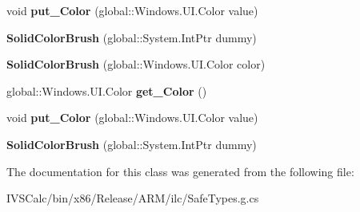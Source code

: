\begin{DoxyCompactItemize}
void {\bfseries put\+\_\+\+Color} (global\+::\+Windows.\+U\+I.\+Color value)
\item 
\mbox{\label{class_windows_1_1_u_i_1_1_xaml_1_1_media_1_1_solid_color_brush_a5ca00027c961ac6710af259a53e61a4f}} 
{\bfseries Solid\+Color\+Brush} (global\+::\+System.\+Int\+Ptr dummy)
\item 
\mbox{\label{class_windows_1_1_u_i_1_1_xaml_1_1_media_1_1_solid_color_brush_a49e7ddff482552689d093494d694a771}} 
{\bfseries Solid\+Color\+Brush} (global\+::\+Windows.\+U\+I.\+Color color)
\item 
\mbox{\label{class_windows_1_1_u_i_1_1_xaml_1_1_media_1_1_solid_color_brush_ab2c188c3b9080b30fa7e0da12b1d0f73}} 
global\+::\+Windows.\+U\+I.\+Color {\bfseries get\+\_\+\+Color} ()
\item 
\mbox{\label{class_windows_1_1_u_i_1_1_xaml_1_1_media_1_1_solid_color_brush_a3609707ee7fa603c3a45c4c62448dfb7}} 
void {\bfseries put\+\_\+\+Color} (global\+::\+Windows.\+U\+I.\+Color value)
\item 
\mbox{\label{class_windows_1_1_u_i_1_1_xaml_1_1_media_1_1_solid_color_brush_a5ca00027c961ac6710af259a53e61a4f}} 
{\bfseries Solid\+Color\+Brush} (global\+::\+System.\+Int\+Ptr dummy)
\end{DoxyCompactItemize}


The documentation for this class was generated from the following file\+:\begin{DoxyCompactItemize}
\item 
I\+V\+S\+Calc/bin/x86/\+Release/\+A\+R\+M/ilc/Safe\+Types.\+g.\+cs\end{DoxyCompactItemize}
